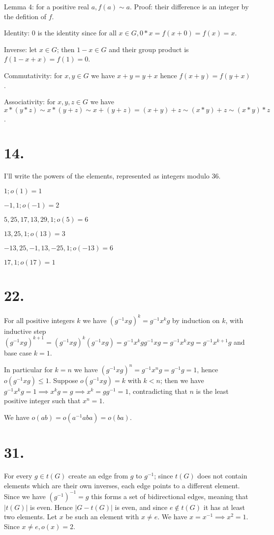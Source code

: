 \documentclass{article}
\begin{document}
Lemma 4: for a positive real $a, f(a) \sim a$. Proof: their difference is an integer by the defition of $f$.

Identity: $0$ is the identity since for all $x \in G, 0*x = f(x+0) = f(x) = x$.

Inverse: let $x \in G$; then $1-x \in G$ and their group product is $f(1-x+x) = f(1) = 0$.

Commutativity: for $x, y \in G$ we have $x+y = y+x$ hence $f(x+y) = f(y+x)$.

Associativity: for $x, y, z \in G$ we have $x*(y*z) \sim x*(y+z) \sim x+(y+z) = (x+y)+z \sim (x*y)+z \sim (x*y)*z$.

\section*{14.}

I'll write the powers of the elements, represented as integers modulo $36$.

$1; o(1)=1$ 

$-1, 1; o(-1) = 2$

$5, 25, 17, 13, 29, 1; o(5) = 6$

$13, 25, 1; o(13) = 3$

$-13, 25, -1, 13, -25, 1; o(-13) = 6$

$17, 1; o(17) = 1$

\section*{22.}

For all positive integers $k$ we have $(g^{-1}xg)^k = g^{-1}x^kg$ by induction on $k$, with inductive step $(g^{-1}xg)^{k+1} = (g^{-1}xg)^k (g^{-1}xg) = g^{-1}x^kg g^{-1}xg = g^{-1}x^kxg = g^{-1}x^{k+1}g$ and base case $k=1$.

In particular for $k=n$ we have $(g^{-1}xg)^n = g^{-1}x^ng = g^{-1}g = 1$, hence $o(g^{-1}xg) \le 1$. Suppose $o(g^{-1}xg) = k$ with $k < n$; then we have $g^{-1}x^kg = 1 \implies x^k g = g \implies x^k = g g^{-1} = 1$, contradicting that $n$ is the least positive integer such that $x^n = 1$.

We have $o(ab) = o(a^{-1}aba) = o(ba)$.

\section*{31.}

For every $g \in t(G)$ create an edge from $g$ to $g^{-1}$; since $t(G)$ does not contain elements which are their own inverses, each edge points to a different element. Since we have $(g^{-1})^{-1} = g$ this forms a set of bidirectional edges, meaning that $|t(G)|$ is even. Hence $|G - t(G)|$ is even, and since $e \not\in t(G)$ it has at least two elements. Let $x$ be such an element with $x \ne e$. We have $x = x^{-1} \implies x^2 = 1$. Since $x \ne e, o(x) = 2$.
\end{document}
